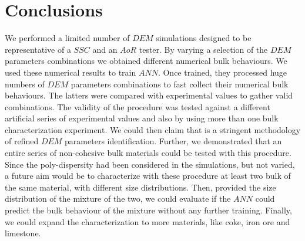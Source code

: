 \section{Conclusions}
\label{sec:conclusions}
We performed a 
limited number of $DEM$ simulations designed to be representative of a $SSC$ and an $AoR$ tester. 
By varying a selection of the $DEM$ parameters combinations we obtained different numerical bulk behaviours. 
We used these numerical results to train $ANN$. Once trained, they processed huge 
numbers of $DEM$ parameters combinations to fast collect their numerical bulk behaviours. 
The latters were compared with experimental values to gather valid combinations. 
The validity of the procedure was tested against a different artificial series of experimental 
values and also by using more than one bulk characterization experiment. 
We could then claim that is a stringent methodology of refined $DEM$ parameters
identification.
Further, we demonstrated that an entire series of non-cohesive bulk materials could be tested with this procedure.
Since the poly-dispersity had been considered in the simulations, but not varied, a future aim would 
be to characterize with these procedure at least two bulk of the same material, with different size distributions. 
Then, provided the size distribution of the mixture of the two, we could evaluate if the $ANN$ could predict 
the bulk behaviour of the mixture without any further training. 
Finally, we could expand the characterization to more materials, like coke, iron
ore and limestone.

